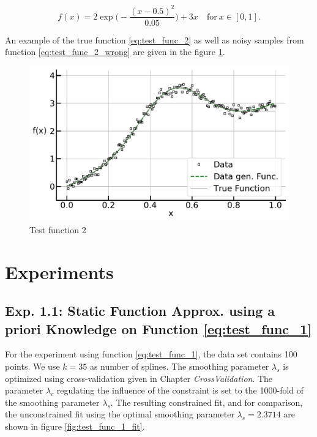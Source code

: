 \documentclass[10pt,a4paper]{article}
\begin{document}
\begin{equation} \label{eq:test_func_2_wrong}
	f(x) = 2\exp \big(-\frac{(x-0.5)^2}{0.05} \big) + 3x  \quad \text{for} \ x \in [0, 1]. 
\end{equation}

An example of the true function \ref{eq:test_func_2} as well as noisy samples from function \ref{eq:test_func_2_wrong} are given in the figure \ref{fig:test_func_2}.

\begin{figure}[h]
	\centering
	\includegraphics[width=\columnwidth]{../thesisplots/exp_peak_data.pdf}
	\caption{Test function 2}
	\label{fig:test_func_2}
\end{figure}

\section{Experiments}

\subsection{Exp. 1.1: Static Function Approx. using a priori Knowledge on Function \ref{eq:test_func_1}} \label{subsec:exp11}

For the experiment using function \ref{eq:test_func_1}, the data set contains 100 points. We use $k=35$ as number of splines. The smoothing parameter $\lambda_s$ is optimized using cross-validation given in Chapter \emph{CrossValidation}. The parameter $\lambda_c$ regulating the influence of the constraint is set to the 1000-fold of the smoothing parameter $\lambda_s$. The resulting constrained fit, and for comparison, the unconstrained fit using the optimal smoothing parameter $\lambda_s = 2.3714$ are shown in figure \ref{fig:test_func_1_fit}.
\end{document}
